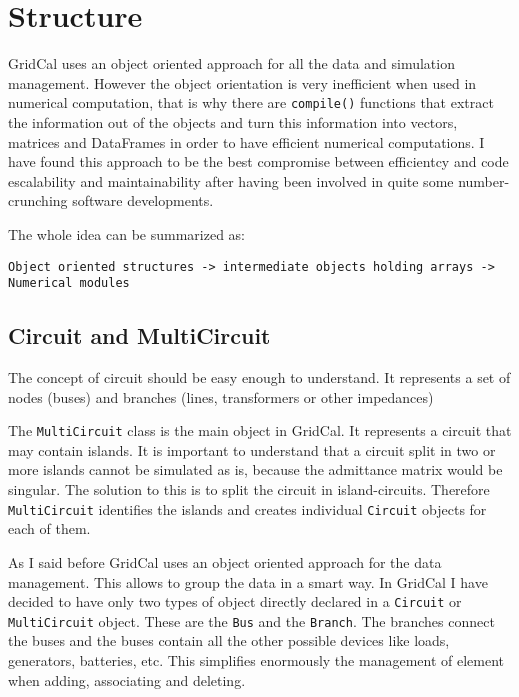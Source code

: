 \documentclass[11pt,fleqn]{book} %
\begin{document}
\chapter{Structure}

GridCal uses an object oriented approach for all the data and simulation management. However the object orientation is very inefficient when used in numerical computation, that is why there are \verb|compile()| functions that extract the information out of the objects and turn this information into vectors, matrices and DataFrames in order to have efficient numerical computations. I have found this approach to be the best compromise between efficientcy and code escalability and maintainability after having been involved in quite some number-crunching software developments.

The whole idea can be summarized as:

\begin{verbatim}
Object oriented structures -> intermediate objects holding arrays -> Numerical modules
\end{verbatim}




\section{Circuit and MultiCircuit}

The concept of circuit should be easy enough to understand. It represents a set of nodes (buses) and branches (lines, transformers or other impedances)


The \verb|MultiCircuit| class is the main object in GridCal. It represents a circuit that may contain islands. It is important to understand that a circuit split in two or more islands cannot be simulated as is, because the admittance matrix would be singular. The solution to this is to split the circuit in island-circuits. Therefore \verb|MultiCircuit| identifies the islands and creates individual \verb|Circuit| objects for each of them.

As I said before GridCal uses an object oriented approach for the data management. This allows to group the data in a smart way. In GridCal I have decided to have only two types of object directly declared in a \verb|Circuit| or \verb|MultiCircuit| object. These are the \verb|Bus| and the \verb|Branch|. The branches connect the buses and the buses contain all the other possible devices like loads, generators, batteries, etc. This simplifies enormously the management of element when adding, associating and deleting.
\end{document}
